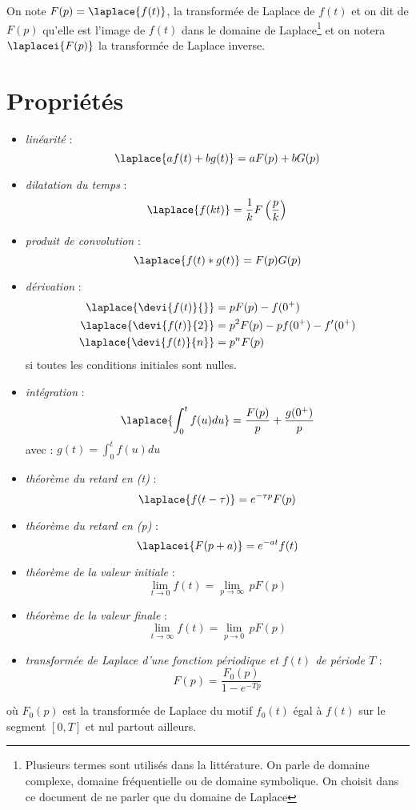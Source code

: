 On note $F(p)=\laplace{f(t)}$, la transformée de Laplace de $f(t)$ et on dit 
de $F(p)$ qu'elle est l'image de $f(t)$ dans le domaine de 
Laplace\footnote{Plusieurs termes sont utilisés dans la littérature. On parle 
de domaine complexe, domaine fréquentielle ou de domaine symbolique. On choisit 
dans ce document de ne parler que du domaine de Laplace} et on notera 
$\laplacei{F(p)}$ la transformée de Laplace inverse.
\section{Propriétés} 
\begin{itemize}
\item \emph{linéarité} :
$$ 
\laplace{af(t)+bg(t)} = aF(p) + bG(p)
$$ 
\item \emph{dilatation du temps} : 
$$
\laplace{f(kt)}=\dfrac{1}{k}F\left(\dfrac{p}{k}\right)
$$
\item \emph{produit de convolution} : 
$$
\laplace{f(t)*g(t)} = F(p)G(p)
$$
\item \emph{dérivation} : 
\begin{align*}
\laplace{\devi{f(t)}{}}&=pF(p) - f(0^+) \\
\laplace{\devi{f(t)}{2}}&=p^2F(p) - pf(0^+) - f'(0^+)\\
\laplace{\devi{f(t)}{n}}&=p^nF(p) 
\end{align*}
si toutes les conditions initiales sont nulles.
\item \emph{intégration} :
$$
\laplace{\int_0^t f(u)du} = \dfrac{F(p)}{p} + \dfrac{g(0^+)}{p}
$$
avec :
$g(t)=\int_0^t f(u)du$
\item \emph{théorème du retard en (t)} :
$$
\laplace{f(t-\tau)}=e^{-\tau p}F(p)
$$
\item \emph{théorème du retard en (p)} :
$$
\laplacei{F(p+a)}=e^{-at}f(t)
$$
\item \emph{théorème de la valeur initiale} :
$$
\lim\limits_{t \to 0} f(t)=\lim\limits_{p \to \infty}\, p F(p)
$$
\item \emph{théorème de la valeur finale} :
$$
\lim\limits_{t \to \infty} f(t)=\lim\limits_{p \to 0}\,p F(p)
$$
\item \emph{transformée de Laplace d'une fonction périodique 
      et $f(t)$ de période $T$} :
$$
        F(p) = \dfrac{F_0(p)}{1-e^{-Tp}}
$$
\end{itemize}
où $F_0(p)$ est la transformée de Laplace du motif $f_0(t)$ égal à 
$f(t)$ sur le segment $[0,T]$ et nul partout ailleurs.

